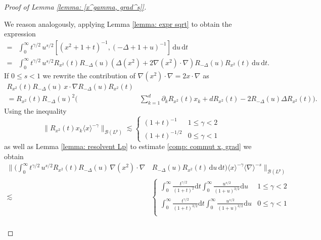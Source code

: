 \documentclass[12pt]{article}
\theoremstyle{plain}
\begin{document}
\begin{proof}[Proof of Lemma \ref{lemma: [x^gamma, grad^s]}]
\begin{itemize}
    We reason analogously, applying Lemma \ref{lemma: expr sqrt} to obtain the expression
    \begin{align}
        [\langle x \rangle^\gamma , \langle \nabla \rangle^s] =& \int_0^\infty t^{\gamma/2}\,u^{s/2}[ (x^2 + 1+t)^{-1}, (-\Delta + 1 + u)^{-1}]\, \mathrm{d}u\, \mathrm{d}t \nonumber\\
         =& \int_0^\infty t^{\gamma/2}\,u^{s/2} R_{x^2}(t)R_{-\Delta} (u) (\Delta (x^2) + 2\nabla(x^2)\cdot \nabla)R_{-\Delta} (u)R_{x^2}(t)\, \mathrm{d}u\, \mathrm{d}t \label{comp: int commut}. 
    \end{align}
     If $0\leq s<1$ we rewrite the contribution of $\nabla(x^2)\cdot \nabla = 2x\cdot \nabla $ as 
     \begin{align}
        R_{x^2}(t)R_{-\Delta} (u) \, x\cdot \nabla R_{-\Delta} (u)R_{x^2}(t) & \nonumber\\
        =R_{x^2}(t)R_{-\Delta} (u)^2  \big(\,& \sum_{k=1}^d    \partial_k  R_{x^2}(t) x_k + dR_{x^2}(t)-2R_{-\Delta} (u) \Delta R_{x^2}(t) \big). \label{comp: commut x, grad}
    \end{align}
    Using the inequality
    \begin{equation*}
        \|R_{x^2}(t)x_k \langle x \rangle^{-\gamma}\|_{\mathcal{B}(L^p)} \lesssim \begin{cases}
            (1 + t)^{-1} & 1\leq \gamma <2\\
            (1 + t)^{-1/2} & 0 \leq \gamma <1
        \end{cases}
    \end{equation*}
as well as Lemma \ref{lemma: resolvent Lp} to estimate \eqref{comp: commut x, grad} we obtain
    \begin{align}
        \Big\| \Big (\int_0^\infty t^{\gamma/2}\,u^{s/2} R_{x^2}(t)R_{-\Delta} (u) \, \nabla(x^2)\cdot \nabla&\,R_{-\Delta} (u)R_{x^2} (t)\, \mathrm{d}u\, \mathrm{d}t\Big ) \langle x \rangle^{-\gamma} \langle \nabla \rangle^{-s}\Big\|_{\mathcal{B}(L^p)}\nonumber\\
        \lesssim  & \begin{cases}
            \int_0^\infty \frac{t^{\gamma/2}}{(1+t)^2} \mathrm{d}t  \int_0^\infty \frac{u^{s/2}}{(1+u)^{3/2}}  \mathrm{d}u & 1\leq \gamma <2\nonumber\\
            \int _0^\infty \frac{t^{\gamma/2}}{(1+t)^{3/2}} \mathrm{d}t  \int_0^\infty \frac{u^{s/2}}{(1+u)^{3/2}}  \mathrm{d}u & 0\leq \gamma <1\nonumber\\
        \end{cases}\nonumber\\

\end{align}
\end{itemize}
\end{proof}
\end{document}
